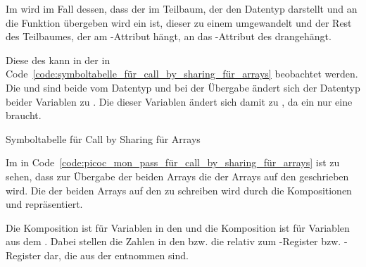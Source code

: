 Im  wird im Fall dessen, dass der  im Teilbaum, der den Datentyp darstellt und an die Funktion übergeben wird ein   ist, dieser zu einem   umgewandelt und der Rest des Teilbaumes, der am -Attribut hängt, an das -Attribut des   drangehängt.

Diese  des  kann in der  in Code~\ref{code:symboltabelle_für_call_by_sharing_für_arrays} beobachtet werden. Die   und  sind beide vom Datentyp  und bei der Übergabe ändert sich der Datentyp beider Variablen zu . Die  dieser Variablen ändert sich damit zu , da ein   nur eine  braucht.

\begin{code}
  \centering
  \caption{Symboltabelle für Call by Sharing für Arrays}
  \label{code:symboltabelle_für_call_by_sharing_für_arrays}
\end{code}

Im  in Code~\ref{code:picoc_mon_pass_für_call_by_sharing_für_arrays} ist zu sehen, dass zur Übergabe der beiden Arrays die  der Arrays auf den  geschrieben wird. Die  der beiden Arrays auf den  zu schreiben wird durch die Kompositionen  und  repräsentiert.

Die Komposition  ist für Variablen in den  und die Komposition  ist für Variablen aus dem . Dabei stellen die Zahlen in den   bzw.  die  relativ zum -Register bzw. -Register dar, die aus der  entnommen sind.

